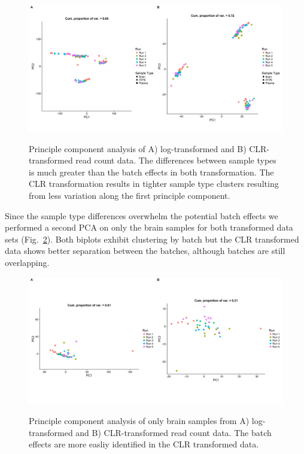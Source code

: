 \documentclass{article}\usepackage[]{graphicx}\usepackage[]{color}
\theoremstyle{definition}
\begin{document}
\begin{figure}
\includegraphics[scale=0.4]{./Figures/IO_PCA_2plot}
\label{rawPCA}
\caption{Principle component analysis of A) log-transformed and B) CLR-transformed read count data.  The differences between sample types is much greater than the batch effects in both transformation.  The CLR transformation results in tighter sample type clusters resulting from less variation along the first principle component. }
\end{figure}

Since the sample type differences overwhelm the potential batch effects we performed a second PCA on only the brain samples for both transformed data sets (Fig.~\ref{rawPCAbrain}).  Both biplots exhibit clustering by batch but the CLR transformed data shows better separation between the batches, although batches are still overlapping.  \\

\begin{figure}
\includegraphics[scale=0.4]{./Figures/IO_PCA_Brain_logRaw_CLR}
\label{rawPCAbrain}
\caption{Principle component analysis of only brain samples from A) log-transformed and B) CLR-transformed read count data. The batch effects are more easliy identified in the CLR transformed data.}
\end{figure}
\end{document}
